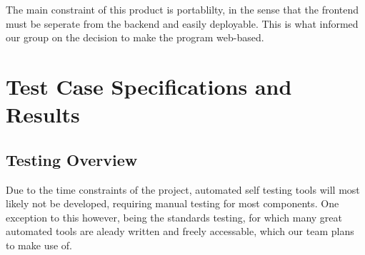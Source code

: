 
The main constraint of this product is portablilty, in the sense that the
frontend must be seperate from the backend and easily deployable. This is
what informed our group on the decision to make the program web-based.

\section{Test Case Specifications and
Results}

\subsection{Testing Overview}




Due to the time constraints of the project, automated self testing tools will most
likely not be developed, requiring manual testing for most components. One exception
to this however, being the standards testing, for which many great automated tools are
aleady written and freely accessable, which our team plans to make use of.

